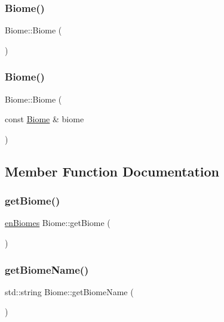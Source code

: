 \subsubsection{\texorpdfstring{Biome()}{Biome()}\hspace{0.1cm}{\footnotesize\ttfamily [1/2]}}
{\footnotesize\ttfamily Biome\+::\+Biome (\begin{DoxyParamCaption}{ }\end{DoxyParamCaption})}

\mbox{\label{class_biome_a6145de7d30bcbef4b6042ee456f88f16}} 
\subsubsection{\texorpdfstring{Biome()}{Biome()}\hspace{0.1cm}{\footnotesize\ttfamily [2/2]}}
{\footnotesize\ttfamily Biome\+::\+Biome (\begin{DoxyParamCaption}\item[{const \mbox{\hyperlink{class_biome}{Biome}} \&}]{biome }\end{DoxyParamCaption})}



\subsection{Member Function Documentation}
\mbox{\label{class_biome_aed98ff023d5563e1ca0309180064fbc4}} 
\subsubsection{\texorpdfstring{get\+Biome()}{getBiome()}}
{\footnotesize\ttfamily \mbox{\hyperlink{_enum_types_8hpp_a5c2255009cd01c90cf68245e6f453d1c}{en\+Biomes}} Biome\+::get\+Biome (\begin{DoxyParamCaption}{ }\end{DoxyParamCaption})}

\mbox{\label{class_biome_ad3cbf2a1fcdea543a2104fde28766f90}} 
\subsubsection{\texorpdfstring{get\+Biome\+Name()}{getBiomeName()}}
{\footnotesize\ttfamily std\+::string Biome\+::get\+Biome\+Name (\begin{DoxyParamCaption}{ }\end{DoxyParamCaption})}

